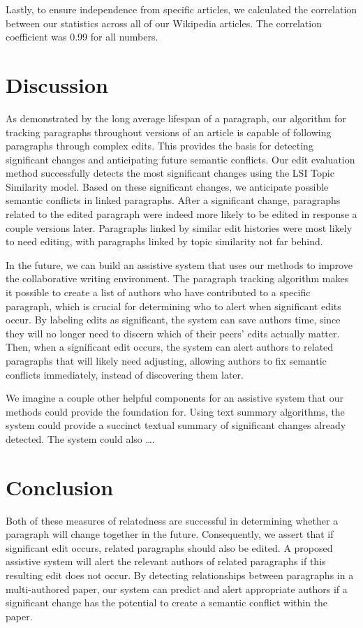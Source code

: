 Lastly, to ensure independence from specific articles, we calculated the
correlation between our statistics across all of our Wikipedia articles.
The correlation coefficient was 0.99 for all numbers.

\section{Discussion}\label{discussion}

As demonstrated by the long average lifespan of a paragraph, our
algorithm for tracking paragraphs throughout versions of an article is
capable of following paragraphs through complex edits. This provides the
basis for detecting significant changes and anticipating future semantic
conflicts. Our edit evaluation method successfully detects the most
significant changes using the LSI Topic Similarity model. Based on these
significant changes, we anticipate possible semantic conflicts in linked
paragraphs. After a significant change, paragraphs related to the edited
paragraph were indeed more likely to be edited in response a couple
versions later. Paragraphs linked by similar edit histories were most
likely to need editing, with paragraphs linked by topic similarity not
far behind.

In the future, we can build an assistive system that uses our methods to
improve the collaborative writing environment. The paragraph tracking
algorithm makes it possible to create a list of authors who have
contributed to a specific paragraph, which is crucial for determining
who to alert when significant edits occur. By labeling edits as
significant, the system can save authors time, since they will no longer
need to discern which of their peers' edits actually matter. Then, when
a significant edit occurs, the system can alert authors to related
paragraphs that will likely need adjusting, allowing authors to fix
semantic conflicts immediately, instead of discovering them later.

We imagine a couple other helpful components for an assistive system
that our methods could provide the foundation for. Using text summary
algorithms, the system could provide a succinct textual summary of
significant changes already detected. The system could also \ldots{}.

\section{Conclusion}\label{conclusion}

Both of these measures of relatedness are successful in determining
whether a paragraph will change together in the future. Consequently, we
assert that if significant edit occurs, related paragraphs should also
be edited. A proposed assistive system will alert the relevant authors
of related paragraphs if this resulting edit does not occur. By
detecting relationships between paragraphs in a multi-authored paper,
our system can predict and alert appropriate authors if a significant
change has the potential to create a semantic conflict within the paper.

